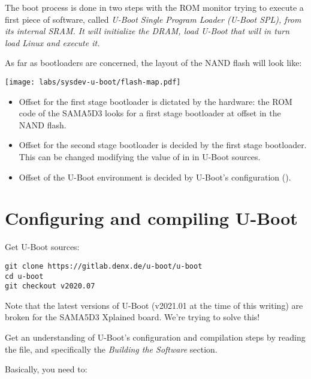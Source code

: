The boot process is done in two steps with the ROM monitor trying to
execute a first piece of software, called \em{U-Boot Single Program
Loader (U-Boot SPL)}, from its internal SRAM. It will initialize the
DRAM, load \em{U-Boot} that will in turn load Linux and execute it.

As far as bootloaders are concerned, the layout of the NAND flash will
look like:

\begin{center}
  \texttt{[image: labs/sysdev-u-boot/flash-map.pdf]}
\end{center}

\begin{itemize}
\item Offset  for the first stage bootloader is dictated by
  the hardware: the ROM code of the SAMA5D3 looks for a first stage
  bootloader at offset  in the NAND flash.
\item Offset  for the second stage bootloader is decided
  by the first stage bootloader. This can be changed modifying the
  value of  in
   in U-Boot
  sources.
\item Offset  of the U-Boot environment is decided by
  U-Boot's configuration ().
\end{itemize}

\section{Configuring and compiling U-Boot}

Get U-Boot sources:

\begin{verbatim}
git clone https://gitlab.denx.de/u-boot/u-boot
cd u-boot
git checkout v2020.07
\end{verbatim}

Note that the latest versions of U-Boot (v2021.01 at the time of this
writing) are broken for the SAMA5D3 Xplained board. We're trying
to solve this!

Get an understanding of U-Boot's
configuration and compilation steps by reading the  file,
and specifically the {\em Building the Software} section.

Basically, you need to:

